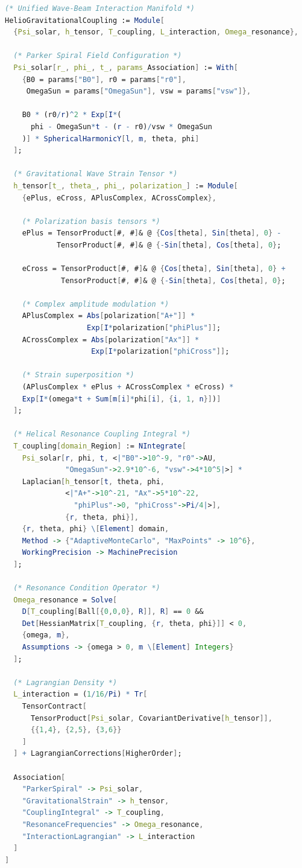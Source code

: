 \begin{lstlisting}[language=Mathematica]
(* Unified Wave-Beam Interaction Manifold *)
HelioGravitationalCoupling := Module[
  {Psi_solar, h_tensor, T_coupling, L_interaction, Omega_resonance},
  
  (* Parker Spiral Field Configuration *)
  Psi_solar[r_, phi_, t_, params_Association] := With[
    {B0 = params["B0"], r0 = params["r0"], 
     OmegaSun = params["OmegaSun"], vsw = params["vsw"]},
    
    B0 * (r0/r)^2 * Exp[I*(
      phi - OmegaSun*t - (r - r0)/vsw * OmegaSun
    )] * SphericalHarmonicY[l, m, theta, phi]
  ];
  
  (* Gravitational Wave Strain Tensor *)
  h_tensor[t_, theta_, phi_, polarization_] := Module[
    {ePlus, eCross, APlusComplex, ACrossComplex},
    
    (* Polarization basis tensors *)
    ePlus = TensorProduct[#, #]& @ {Cos[theta], Sin[theta], 0} - 
            TensorProduct[#, #]& @ {-Sin[theta], Cos[theta], 0};
    
    eCross = TensorProduct[#, #]& @ {Cos[theta], Sin[theta], 0} + 
             TensorProduct[#, #]& @ {-Sin[theta], Cos[theta], 0};
    
    (* Complex amplitude modulation *)
    APlusComplex = Abs[polarization["A+"]] * 
                   Exp[I*polarization["phiPlus"]];
    ACrossComplex = Abs[polarization["Ax"]] * 
                    Exp[I*polarization["phiCross"]];
    
    (* Strain superposition *)
    (APlusComplex * ePlus + ACrossComplex * eCross) * 
    Exp[I*(omega*t + Sum[m[i]*phi[i], {i, 1, n}])]
  ];
  
  (* Helical Resonance Coupling Integral *)
  T_coupling[domain_Region] := NIntegrate[
    Psi_solar[r, phi, t, <|"B0"->10^-9, "r0"->AU, 
              "OmegaSun"->2.9*10^-6, "vsw"->4*10^5|>] * 
    Laplacian[h_tensor[t, theta, phi, 
              <|"A+"->10^-21, "Ax"->5*10^-22, 
                "phiPlus"->0, "phiCross"->Pi/4|>], 
              {r, theta, phi}],
    {r, theta, phi} \[Element] domain,
    Method -> {"AdaptiveMonteCarlo", "MaxPoints" -> 10^6},
    WorkingPrecision -> MachinePrecision
  ];
  
  (* Resonance Condition Operator *)
  Omega_resonance = Solve[
    D[T_coupling[Ball[{0,0,0}, R]], R] == 0 && 
    Det[HessianMatrix[T_coupling, {r, theta, phi}]] < 0,
    {omega, m},
    Assumptions -> {omega > 0, m \[Element] Integers}
  ];
  
  (* Lagrangian Density *)
  L_interaction = (1/16/Pi) * Tr[
    TensorContract[
      TensorProduct[Psi_solar, CovariantDerivative[h_tensor]],
      {{1,4}, {2,5}, {3,6}}
    ]
  ] + LagrangianCorrections[HigherOrder];
  
  Association[
    "ParkerSpiral" -> Psi_solar,
    "GravitationalStrain" -> h_tensor,
    "CouplingIntegral" -> T_coupling,
    "ResonanceFrequencies" -> Omega_resonance,
    "InteractionLagrangian" -> L_interaction
  ]
]
\end{lstlisting}


